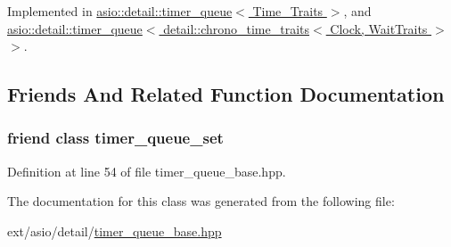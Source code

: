 Implemented in \hyperlink{classasio_1_1detail_1_1timer__queue_a07a7fa16514869c7959d16de73fb7b28}{asio\+::detail\+::timer\+\_\+queue$<$ Time\+\_\+\+Traits $>$}, and \hyperlink{classasio_1_1detail_1_1timer__queue_a07a7fa16514869c7959d16de73fb7b28}{asio\+::detail\+::timer\+\_\+queue$<$ detail\+::chrono\+\_\+time\+\_\+traits$<$ Clock, Wait\+Traits $>$ $>$}.



\subsection{Friends And Related Function Documentation}
\hypertarget{classasio_1_1detail_1_1timer__queue__base_aade26321e998ee881a530538ff540119}{}
\subsubsection[{timer\+\_\+queue\+\_\+set}]{\setlength{\rightskip}{0pt plus 5cm}friend class {\bf timer\+\_\+queue\+\_\+set}\hspace{0.3cm}{\ttfamily [friend]}}\label{classasio_1_1detail_1_1timer__queue__base_aade26321e998ee881a530538ff540119}


Definition at line 54 of file timer\+\_\+queue\+\_\+base.\+hpp.



The documentation for this class was generated from the following file\+:\begin{DoxyCompactItemize}
\item 
ext/asio/detail/\hyperlink{timer__queue__base_8hpp}{timer\+\_\+queue\+\_\+base.\+hpp}\end{DoxyCompactItemize}
